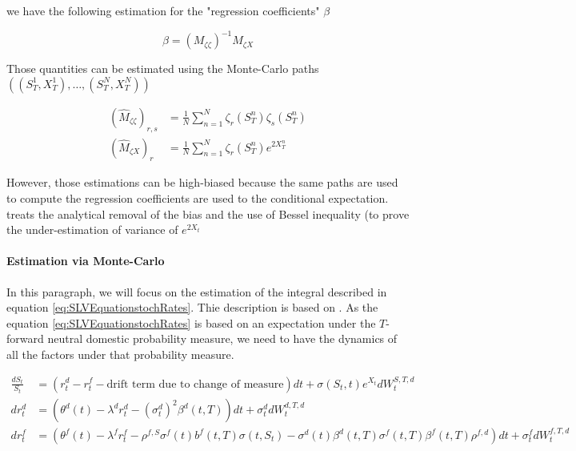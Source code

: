 \documentclass{article}
\begin{document}
\noindent we have the following estimation for the "regression coefficients" $\beta$

\begin{equation}	
	\beta = (M_{\zeta \zeta})^{-1} M_{\zeta X}
\end{equation}

\noindent Those quantities can be estimated using the Monte-Carlo paths $\left((S_T^1,X_T^1),\dots, (S_T^N,X_T^N)\right)$

\begin{equation}
\begin{aligned}
	(\hat{M}_{\zeta \zeta})_{r,s} &= \frac{1}{N} \sum_{n=1}^N \zeta_r(S_T^n)\zeta_s(S_T^n)\\
	(\hat{M}_{\zeta X})_r &= \frac{1}{N} \sum_{n=1}^N \zeta_r(S_T^n)e^{2X_T^n}
\end{aligned}
\end{equation}

\noindent However, those estimations can be high-biased because the same paths are used to compute the regression coefficients are used to the conditional expectation. \cite{Humeau2013} treats the analytical removal of the bias and the use of Bessel inequality (to prove the under-estimation of variance of $e^{2X_t}$

\paragraph{Estimation via Monte-Carlo}

In this paragraph, we will focus on the estimation of the integral described in equation \ref{eq:SLVEquationstochRates}. Thie description is based on \cite{DeelstraRayee2012}. As the equation \ref{eq:SLVEquationstochRates} is based on an expectation under the $T$-forward neutral domestic probability measure, we need to have the dynamics of all the factors under that probability measure.

\begin{equation}
	\begin{aligned}
		\frac{dS_t}{S_t} &= (r_t^d-r_t^f - \text{drift term due to change of measure}) dt + \sigma(S_t, t) e^{X_t} dW^{S,T,d}_t\\
		dr_t^d &= \left(\theta^d(t) - \lambda^d r_t^d - \left(\sigma_t^d\right)^2 \beta^d(t,T) \right) dt + \sigma_t^d dW^{d,T,d}_t\\
		dr_t^f &= \left(\theta^f(t) - \lambda^f r_t^f - \rho^{f,S} \sigma^f(t) b^f(t,T) \sigma(t,S_t)  - \sigma^d(t) \beta^d(t,T) \sigma^f(t,T) \beta^f(t,T) \rho^{f,d}\right) dt + \sigma_t^f dW^{f,T,d}_t
	\end{aligned}
\end{equation}
\end{document}
